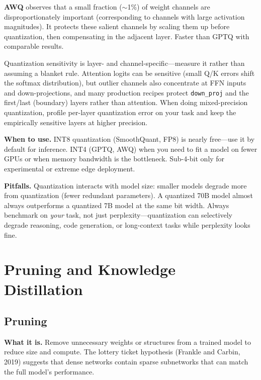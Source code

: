 \textbf{AWQ} observes that a small fraction ($\sim$1\%) of weight channels are disproportionately important (corresponding to channels with large activation magnitudes). It protects these salient channels by scaling them up before quantization, then compensating in the adjacent layer. Faster than GPTQ with comparable results.

\begin{warningbox}
Quantization sensitivity is layer- and channel-specific---measure it rather than assuming a blanket rule. Attention logits can be sensitive (small Q/K errors shift the softmax distribution), but outlier channels also concentrate at FFN inputs and down-projections, and many production recipes protect \texttt{down\_proj} and the first/last (boundary) layers rather than attention. When doing mixed-precision quantization, profile per-layer quantization error on your task and keep the empirically sensitive layers at higher precision.
\end{warningbox}

\textbf{When to use.} INT8 quantization (SmoothQuant, FP8) is nearly free---use it by default for inference. INT4 (GPTQ, AWQ) when you need to fit a model on fewer GPUs or when memory bandwidth is the bottleneck. Sub-4-bit only for experimental or extreme edge deployment.

\textbf{Pitfalls.} Quantization interacts with model size: smaller models degrade more from quantization (fewer redundant parameters). A quantized 70B model almost always outperforms a quantized 7B model at the same bit width. Always benchmark on \textit{your} task, not just perplexity---quantization can selectively degrade reasoning, code generation, or long-context tasks while perplexity looks fine.

\section{Pruning and Knowledge Distillation}
\label{sec:pruning_distillation}

\subsection{Pruning}

\textbf{What it is.} Remove unnecessary weights or structures from a trained model to reduce size and compute. The lottery ticket hypothesis (Frankle and Carbin, 2019) suggests that dense networks contain sparse subnetworks that can match the full model's performance.

